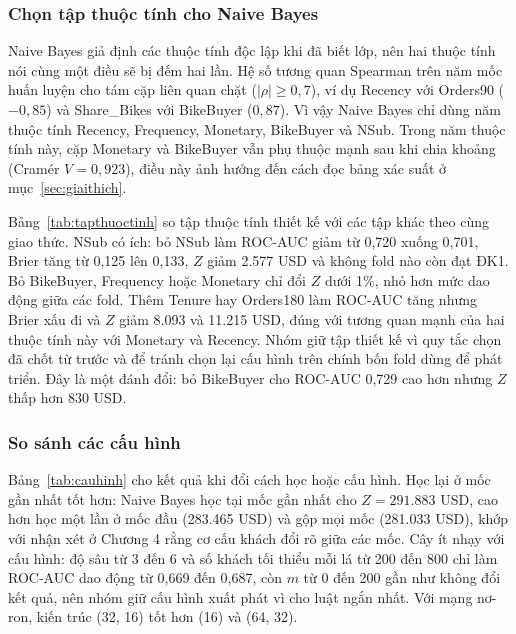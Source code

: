 \subsubsection{Chọn tập thuộc tính cho Naive Bayes}
Naive Bayes giả định các thuộc tính độc lập khi đã biết lớp, nên hai thuộc tính nói cùng một điều sẽ bị đếm hai lần. Hệ số tương quan Spearman trên năm mốc huấn luyện cho tám cặp liên quan chặt ($|\rho| \geq 0{,}7$), ví dụ Recency với Orders90 ($-0{,}85$) và Share\_Bikes với BikeBuyer ($0{,}87$). Vì vậy Naive Bayes chỉ dùng năm thuộc tính Recency, Frequency, Monetary, BikeBuyer và NSub. Trong năm thuộc tính này, cặp Monetary và BikeBuyer vẫn phụ thuộc mạnh sau khi chia khoảng (Cramér $V = 0{,}923$), điều này ảnh hưởng đến cách đọc bảng xác suất ở mục~\ref{sec:giaithich}.

Bảng~\ref{tab:tapthuoctinh} so tập thuộc tính thiết kế với các tập khác theo cùng giao thức. NSub có ích: bỏ NSub làm ROC-AUC giảm từ 0,720 xuống 0,701, Brier tăng từ 0,125 lên 0,133, $Z$ giảm 2.577 USD và không fold nào còn đạt ĐK1. Bỏ BikeBuyer, Frequency hoặc Monetary chỉ đổi $Z$ dưới 1\%, nhỏ hơn mức dao động giữa các fold. Thêm Tenure hay Orders180 làm ROC-AUC tăng nhưng Brier xấu đi và $Z$ giảm 8.093 và 11.215 USD, đúng với tương quan mạnh của hai thuộc tính này với Monetary và Recency. Nhóm giữ tập thiết kế vì quy tắc chọn đã chốt từ trước và để tránh chọn lại cấu hình trên chính bốn fold dùng để phát triển. Đây là một đánh đổi: bỏ BikeBuyer cho ROC-AUC 0,729 cao hơn nhưng $Z$ thấp hơn 830 USD.

\begin{table}[!htbp]
\centering
\caption{Naive Bayes theo tập thuộc tính, trung bình bốn fold}
\label{tab:tapthuoctinh}
\footnotesize
\resizebox{\textwidth}{!}{}
\end{table}

\subsubsection{So sánh các cấu hình}\label{sec:cauhinh}
Bảng~\ref{tab:cauhinh} cho kết quả khi đổi cách học hoặc cấu hình. Học lại ở mốc gần nhất tốt hơn: Naive Bayes học tại mốc gần nhất cho $Z = 291.883$ USD, cao hơn học một lần ở mốc đầu (283.465 USD) và gộp mọi mốc (281.033 USD), khớp với nhận xét ở Chương 4 rằng cơ cấu khách đổi rõ giữa các mốc. Cây ít nhạy với cấu hình: độ sâu từ 3 đến 6 và số khách tối thiểu mỗi lá từ 200 đến 800 chỉ làm ROC-AUC dao động từ 0,669 đến 0,687, còn $m$ từ 0 đến 200 gần như không đổi kết quả, nên nhóm giữ cấu hình xuất phát vì cho luật ngắn nhất. Với mạng nơ-ron, kiến trúc (32, 16) tốt hơn (16) và (64, 32).

